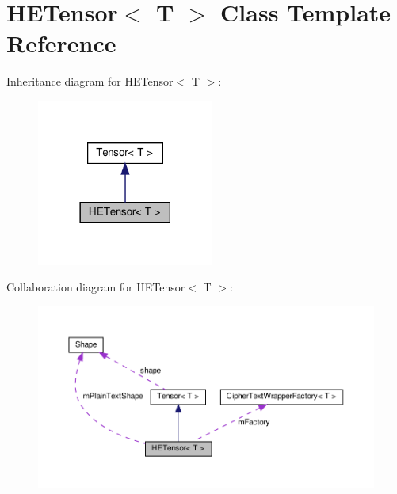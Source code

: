 \hypertarget{classHETensor}{}\section{H\+E\+Tensor$<$ T $>$ Class Template Reference}
\label{classHETensor}


Inheritance diagram for H\+E\+Tensor$<$ T $>$\+:
\nopagebreak
\begin{figure}[H]
\begin{center}
\leavevmode
\includegraphics[width=165pt]{classHETensor__inherit__graph}
\end{center}
\end{figure}


Collaboration diagram for H\+E\+Tensor$<$ T $>$\+:
\nopagebreak
\begin{figure}[H]
\begin{center}
\leavevmode
\includegraphics[width=350pt]{classHETensor__coll__graph}
\end{center}
\end{figure}
